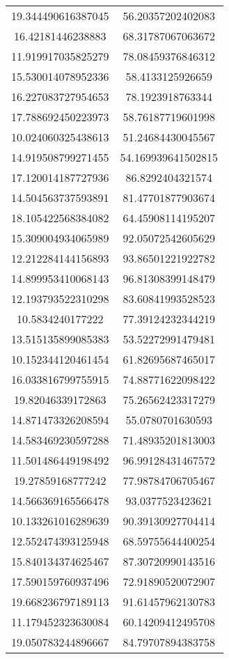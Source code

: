 \begin{table}
\begin{tabular}{cc}
19.344490616387045 & 56.20357202402083 \\
16.42181446238883 & 68.31787067063672 \\
11.919917035825279 & 78.08459376846312 \\
15.530014078952336 & 58.4133125926659 \\
16.227083727954653 & 78.1923918763344 \\
17.788692450223973 & 58.76187719601998 \\
10.024060325438613 & 51.24684430045567 \\
14.919508799271455 & 54.169939641502815 \\
17.120014187727936 & 86.8292404321574 \\
14.504563737593891 & 81.47701877903674 \\
18.105422568384082 & 64.45908114195207 \\
15.309004934065989 & 92.05072542605629 \\
12.212284144156893 & 93.86501221922782 \\
14.899953410068143 & 96.81308399148479 \\
12.193793522310298 & 83.60841993528523 \\
10.5834240177222 & 77.39124232344219 \\
13.515135899085383 & 53.52272991479481 \\
10.152344120461454 & 61.82695687465017 \\
16.033816799755915 & 74.88771622098422 \\
19.82046339172863 & 75.26562423317279 \\
14.871473326208594 & 55.0780701630593 \\
14.583469230597288 & 71.48935201813003 \\
11.501486449198492 & 96.99128431467572 \\
19.27859168777242 & 77.98784706705467 \\
14.566369165566478 & 93.0377523423621 \\
10.133261016289639 & 90.39130927704414 \\
12.552474393125948 & 68.59755644400254 \\
15.840134374625467 & 87.30720990143516 \\
17.590159760937496 & 72.91890520072907 \\
19.668236797189113 & 91.61457962130783 \\
11.179452323630084 & 60.14209412495708 \\
19.050783244896667 & 84.79707894383758 \\

\end{tabular}
\end{table}
